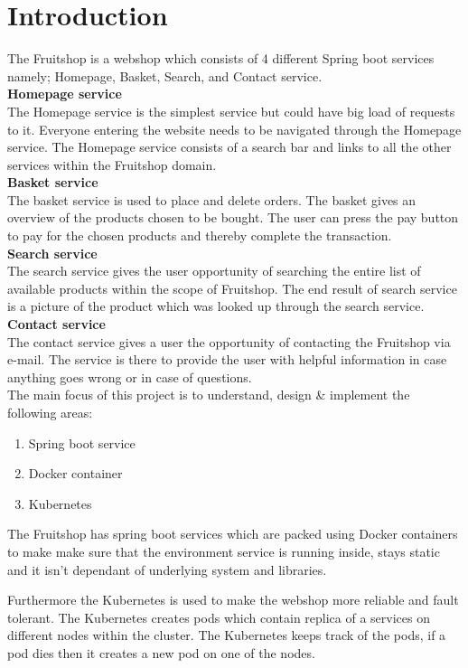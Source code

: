\chapter{Introduction}\label{ch:introduction}

The Fruitshop is a webshop which consists of 4 different Spring boot services namely; Homepage, Basket, Search, and Contact service.\\ 


\textbf{Homepage service}\\
The Homepage service is the simplest service but could have big load of requests to it. Everyone entering the website needs to be navigated through the Homepage service. 
The Homepage service consists of a search bar and links to all the other services within the Fruitshop domain.\\ 

\textbf{Basket service }\\
The basket service is used to place and delete orders. The basket gives an overview of the products chosen to be bought. The user can press the pay button to pay for the chosen products and thereby complete the transaction.\\ 

\textbf{Search service }\\
The search service gives the user opportunity of searching the entire list of available products within the scope of Fruitshop. The end result of search service is a picture of the product which was looked up through the search service.\\   

\textbf{Contact service}\\
The contact service gives a user the opportunity of contacting the Fruitshop via e-mail. The service is there to provide the user with helpful information in case anything goes wrong or in case of questions.\\

The main focus of this project is to understand, design \& implement the following areas:  

\begin{enumerate}
	\item Spring boot service
	\item Docker container
	\item Kubernetes
\end{enumerate}

The Fruitshop has spring boot services which are packed using Docker containers to make make sure that the environment service is running inside, stays static and it isn't dependant of underlying system and libraries. 

Furthermore the Kubernetes is used to make the webshop more reliable and fault tolerant. The Kubernetes creates pods which contain replica of a services on different nodes within the cluster. The Kubernetes keeps track of the pods, if a pod dies then it creates a new pod on one of the nodes. 





